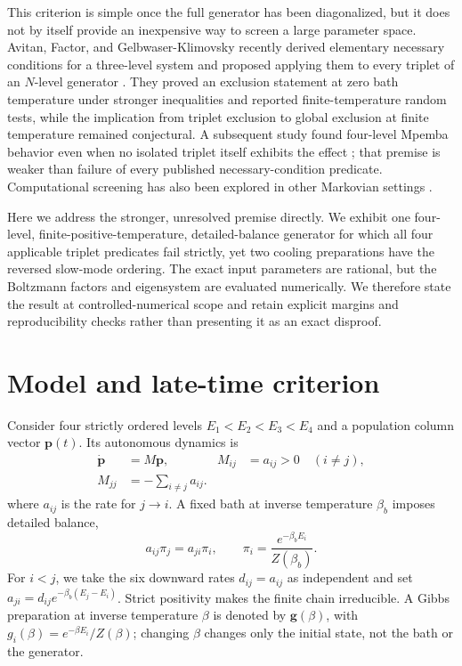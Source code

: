 \documentclass[aps,pre,reprint,superscriptaddress,nofootinbib]{revtex4-2}
\begin{document}
This criterion is simple once the full generator has been diagonalized, but it does
not by itself provide an inexpensive way to screen a large parameter space.  Avitan,
Factor, and Gelbwaser-Klimovsky recently derived elementary necessary conditions for
a three-level system and proposed applying them to every triplet of an $N$-level
generator \cite{Avitan2026}.  They proved an exclusion statement at zero bath
temperature under stronger inequalities and reported finite-temperature random
tests, while the implication from triplet exclusion to global exclusion at finite
temperature remained conjectural.  A subsequent study found four-level Mpemba
behavior even when no isolated triplet itself exhibits the effect
\cite{GelbwaserKlimovsky2026}; that premise is weaker than failure of every published
necessary-condition predicate.  Computational screening has also been explored in
other Markovian settings \cite{Amorim2023}.

Here we address the stronger, unresolved premise directly.  We exhibit one
four-level, finite-positive-temperature, detailed-balance generator for which all
four applicable triplet predicates fail strictly, yet two cooling preparations have
the reversed slow-mode ordering.  The exact input parameters are rational, but the
Boltzmann factors and eigensystem are evaluated numerically.  We therefore state the
result at controlled-numerical scope and retain explicit margins and reproducibility
checks rather than presenting it as an exact disproof.

\section{Model and late-time criterion}

Consider four strictly ordered levels $E_1<E_2<E_3<E_4$ and a population column
vector $\bm p(t)$.  Its autonomous dynamics is
\begin{equation}
 \begin{aligned}
  \dot{\bm p}&=M\bm p,
  & M_{ij}&=a_{ij}>0\quad(i\ne j),\\
  M_{jj}&=-\sum_{i\ne j}a_{ij}.&&
 \end{aligned}
  \label{eq:master}
\end{equation}
where $a_{ij}$ is the rate for $j\to i$.  A fixed bath at inverse temperature
$\beta_b$ imposes detailed balance,
\begin{equation}
 a_{ij}\pi_j=a_{ji}\pi_i,
 \qquad
 \pi_i=\frac{e^{-\beta_b E_i}}{Z(\beta_b)}.
 \label{eq:db}
\end{equation}
For $i<j$, we take the six downward rates $d_{ij}=a_{ij}$ as independent and set
$a_{ji}=d_{ij}e^{-\beta_b(E_j-E_i)}$.  Strict positivity makes the finite chain
irreducible.  A Gibbs preparation at inverse temperature $\beta$ is denoted by
$\bm g(\beta)$, with $g_i(\beta)=e^{-\beta E_i}/Z(\beta)$; changing $\beta$ changes
only the initial state, not the bath or the generator.
\end{document}
